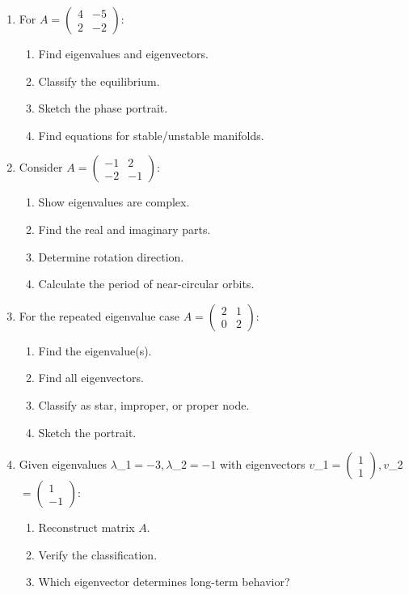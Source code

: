 \documentclass[12pt]{article}
\begin{document}
\begin{enumerate}[resume]
\item For $A = \begin{pmatrix} 4 & -5 \\ 2 & -2 \end{pmatrix}$:
\begin{enumerate}[label=(\alph*)]
    \item Find eigenvalues and eigenvectors.
    \item Classify the equilibrium.
    \item Sketch the phase portrait.
    \item Find equations for stable/unstable manifolds.
\end{enumerate}

\item Consider $A = \begin{pmatrix} -1 & 2 \\ -2 & -1 \end{pmatrix}$:
\begin{enumerate}[label=(\alph*)]
    \item Show eigenvalues are complex.
    \item Find the real and imaginary parts.
    \item Determine rotation direction.
    \item Calculate the period of near-circular orbits.
\end{enumerate}

\item For the repeated eigenvalue case $A = \begin{pmatrix} 2 & 1 \\ 0 & 2 \end{pmatrix}$:
\begin{enumerate}[label=(\alph*)]
    \item Find the eigenvalue(s).
    \item Find all eigenvectors.
    \item Classify as star, improper, or proper node.
    \item Sketch the portrait.
\end{enumerate}

\item Given eigenvalues $\lambda$_{1}$ = -3, \lambda$_{2}$ = -1$ with eigenvectors $v$_{1}$ = \begin{pmatrix} 1 \\ 1 \end{pmatrix}, v$_{2}$ = \begin{pmatrix} 1 \\ -1 \end{pmatrix}$:
\begin{enumerate}[label=(\alph*)]
    \item Reconstruct matrix $A$.
    \item Verify the classification.
    \item Which eigenvector determines long-term behavior?
\end{enumerate}


\end{enumerate}
\end{document}
